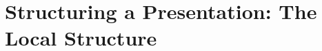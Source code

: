 \documentclass{beamer}
\begin{document}
\section{Structuring a Presentation: The Local Structure}
\end{document}
